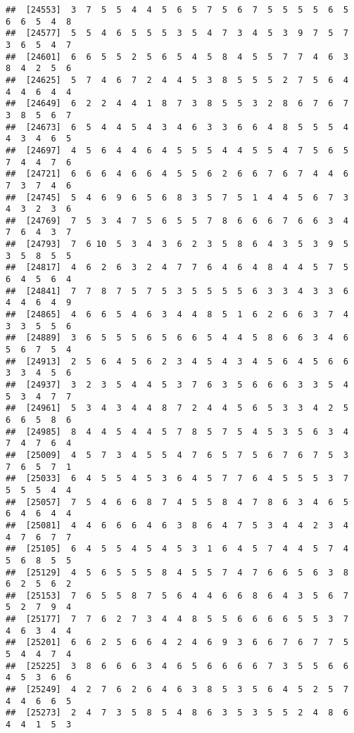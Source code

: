 \documentclass[
]{book}
\begin{document}
\begin{verbatim}
##  [24553]  3  7  5  5  4  4  5  6  5  7  5  6  7  5  5  5  5  6  5  6  6  5  4  8
##  [24577]  5  5  4  6  5  5  5  3  5  4  7  3  4  5  3  9  7  5  7  3  6  5  4  7
##  [24601]  6  6  5  5  2  5  6  5  4  5  8  4  5  5  7  7  4  6  3  8  4  2  5  6
##  [24625]  5  7  4  6  7  2  4  4  5  3  8  5  5  5  2  7  5  6  4  4  4  6  4  4
##  [24649]  6  2  2  4  4  1  8  7  3  8  5  5  3  2  8  6  7  6  7  3  8  5  6  7
##  [24673]  6  5  4  4  5  4  3  4  6  3  3  6  6  4  8  5  5  5  4  4  3  4  6  5
##  [24697]  4  5  6  4  4  6  4  5  5  5  4  4  5  5  4  7  5  6  5  7  4  4  7  6
##  [24721]  6  6  6  4  6  6  4  5  5  6  2  6  6  7  6  7  4  4  6  7  3  7  4  6
##  [24745]  5  4  6  9  6  5  6  8  3  5  7  5  1  4  4  5  6  7  3  4  3  2  3  6
##  [24769]  7  5  3  4  7  5  6  5  5  7  8  6  6  6  7  6  6  3  4  7  6  4  3  7
##  [24793]  7  6 10  5  3  4  3  6  2  3  5  8  6  4  3  5  3  9  5  3  5  8  5  5
##  [24817]  4  6  2  6  3  2  4  7  7  6  4  6  4  8  4  4  5  7  5  6  4  5  6  4
##  [24841]  7  7  8  7  5  7  5  3  5  5  5  5  6  3  3  4  3  3  6  4  4  6  4  9
##  [24865]  4  6  6  5  4  6  3  4  4  8  5  1  6  2  6  6  3  7  4  3  3  5  5  6
##  [24889]  3  6  5  5  5  6  5  6  6  5  4  4  5  8  6  6  3  4  6  5  6  7  5  4
##  [24913]  2  5  6  4  5  6  2  3  4  5  4  3  4  5  6  4  5  6  6  3  3  4  5  6
##  [24937]  3  2  3  5  4  4  5  3  7  6  3  5  6  6  6  3  3  5  4  5  3  4  7  7
##  [24961]  5  3  4  3  4  4  8  7  2  4  4  5  6  5  3  3  4  2  5  6  6  5  8  6
##  [24985]  8  4  4  5  4  4  5  7  8  5  7  5  4  5  3  5  6  3  4  7  4  7  6  4
##  [25009]  4  5  7  3  4  5  5  4  7  6  5  7  5  6  7  6  7  5  3  7  6  5  7  1
##  [25033]  6  4  5  5  4  5  3  6  4  5  7  7  6  4  5  5  5  3  7  5  5  5  4  4
##  [25057]  7  5  4  6  6  8  7  4  5  5  8  4  7  8  6  3  4  6  5  6  4  6  4  4
##  [25081]  4  4  6  6  6  4  6  3  8  6  4  7  5  3  4  4  2  3  4  4  7  6  7  7
##  [25105]  6  4  5  5  4  5  4  5  3  1  6  4  5  7  4  4  5  7  4  5  6  8  5  5
##  [25129]  4  5  6  5  5  5  8  4  5  5  7  4  7  6  6  5  6  3  8  6  2  5  6  2
##  [25153]  7  6  5  5  8  7  5  6  4  4  6  6  8  6  4  3  5  6  7  5  2  7  9  4
##  [25177]  7  7  6  2  7  3  4  4  8  5  5  6  6  6  6  5  5  3  7  4  6  3  4  4
##  [25201]  6  6  2  5  6  6  4  2  4  6  9  3  6  6  7  6  7  7  5  5  4  4  7  4
##  [25225]  3  8  6  6  6  3  4  6  5  6  6  6  6  7  3  5  5  6  6  4  5  3  6  6
##  [25249]  4  2  7  6  2  6  4  6  3  8  5  3  5  6  4  5  2  5  7  4  4  6  6  5
##  [25273]  2  4  7  3  5  8  5  4  8  6  3  5  3  5  5  2  4  8  6  4  4  1  5  3

\end{verbatim}
\end{document}
